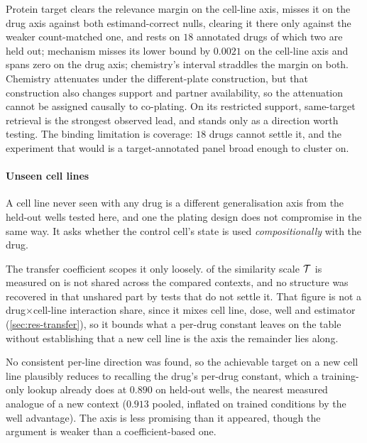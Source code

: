 Protein target clears the relevance margin on the cell-line axis, misses it on
the drug axis against both estimand-correct nulls, clearing it there only
against the weaker count-matched one, and rests on $18$ annotated drugs of which
two are held out; mechanism misses its lower bound by $0.0021$ on the cell-line
axis and spans zero on the drug axis; chemistry's interval straddles the margin
on both. Chemistry attenuates under the different-plate construction, but that
construction also changes support and partner availability, so the attenuation
cannot be assigned causally to co-plating. On its restricted support, same-target
retrieval is the strongest observed lead, and stands only as a direction worth
testing. The binding limitation is coverage: $18$ drugs cannot settle it, and
the experiment that would is a target-annotated panel broad enough to cluster
on.

\paragraph{Unseen cell lines} A cell line never seen with any drug is a
different generalisation axis from the held-out wells tested here, and one the
plating design does not compromise in the same way. It asks whether the control
cell's state is used \emph{compositionally} with the
drug.

The transfer coefficient scopes it only loosely.  of
the similarity scale $\mathcal{T}$ is measured on is not shared across the compared
contexts, and no structure was recovered in that unshared part by tests that do
not settle it. That figure is not a drug$\times$cell-line interaction share,
since it mixes cell line, dose, well and estimator (\cref{sec:res-transfer}), so
it bounds what a per-drug constant leaves on the table without establishing that
a new cell line is the axis the remainder lies along.

No consistent per-line direction was found, so the achievable target on a new
cell line plausibly reduces to recalling the drug's per-drug constant, which a
training-only lookup already does at $0.890$ on held-out wells, the nearest
measured analogue of a new context ($0.913$ pooled, inflated on trained
conditions by the well advantage). The axis is less promising than it appeared,
though the argument is weaker than a coefficient-based one.

